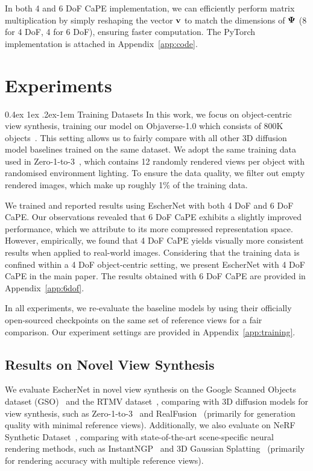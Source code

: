 \documentclass[10pt,twocolumn,letterpaper]{article}
\makeatletter
\renewcommand{\paragraph}{%
  \@startsection{paragraph}{4}%
  {\z@}{0.4ex \@plus 1ex \@minus .2ex}{-1em}%
  {\normalfont\normalsize\bfseries}%
}
\makeatother
\begin{document}
In both 4 and 6 DoF CaPE implementation, we can efficiently perform matrix multiplication by simply reshaping the vector ${\bf v}$ to match the dimensions of ${\bf \Psi}$ (8 for 4 DoF, 4 for 6 DoF), ensuring faster computation. The PyTorch implementation is attached in Appendix~\ref{app:code}. 

\vspace{-0.1cm}
\section{Experiments}

\paragraph{Training Datasets} In this work, we focus on object-centric view synthesis, training our model on Objaverse-1.0 which consists of 800K objects~\cite{deitke2023objaverse}. This setting allows us to fairly compare with all other 3D diffusion model baselines trained on the same dataset.  We adopt the same training data used in Zero-1-to-3~\cite{liu2023zero}, which contains 12 randomly rendered views per object with randomised environment lighting. To ensure the data quality, we filter out empty rendered images, which make up roughly 1\% of the training data. 

We trained and reported results using EscherNet with both 4 DoF and 6 DoF CaPE. Our observations revealed that 6 DoF CaPE exhibits a slightly improved performance, which we attribute to its more compressed representation space. However, empirically, we found that 4 DoF CaPE yields visually more consistent results when applied to real-world images. Considering that the training data is confined within a 4 DoF object-centric setting, we present EscherNet with 4 DoF CaPE in the main paper. The results obtained with 6 DoF CaPE are provided in Appendix~\ref{app:6dof}. 

In all experiments, we re-evaluate the baseline models by using their officially open-sourced checkpoints on the same set of reference views for a fair comparison. Our experiment settings are provided in Appendix~\ref{app:training}. 





\subsection{Results on Novel View Synthesis}
We evaluate EscherNet in novel view synthesis on the Google Scanned Objects dataset (GSO)~\cite{downs2022google} and the RTMV dataset~\cite{tremblay2022rtmv}, comparing with 3D diffusion models for view synthesis,  such as Zero-1-to-3~\cite{liu2023zero} and RealFusion~\cite{melas2023realfusion} (primarily for generation quality with minimal reference views). Additionally, we also evaluate on NeRF Synthetic Dataset~\cite{mildenhall2020nerf}, comparing with state-of-the-art scene-specific neural rendering methods, such as InstantNGP~\cite{muller2022instant} and 3D Gaussian Splatting~\cite{kerbl20233gaussian} (primarily for rendering accuracy with multiple reference views).
\end{document}
